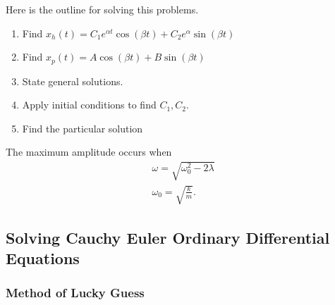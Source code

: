 \begin{theorem}
  Here is the outline for solving this problems.
  \begin{enumerate}
    \item Find $x_h(t)=C_1e^{\alpha t}\cos\left( \beta t \right) +C_2e^{\alpha}\sin\left( \beta t \right) $
    \item Find $x_p(t)=A\cos\left( \beta t \right) +B\sin\left( \beta t \right) $
    \item State general solutions.
    \item Apply initial conditions to find $C_1,C_2$.
    \item Find the particular solution
  \end{enumerate}
\end{theorem}

\begin{note}
  The maximum amplitude occurs when 
  \begin{align*}
    \omega=\sqrt{\omega_0^2-2\lambda}\\
    \omega_0=\sqrt{\frac{k}{m}} 
  .\end{align*}
\end{note}
\subsection{Solving Cauchy Euler Ordinary Differential Equations}
\subsubsection{Method of Lucky Guess}


